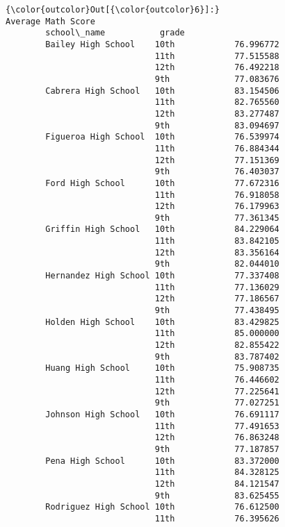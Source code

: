 \documentclass[11pt]{article}
\begin{document}
\begin{Verbatim}[commandchars=\\\{\}]
{\color{outcolor}Out[{\color{outcolor}6}]:}                              Average Math Score
        school\_name           grade                    
        Bailey High School    10th            76.996772
                              11th            77.515588
                              12th            76.492218
                              9th             77.083676
        Cabrera High School   10th            83.154506
                              11th            82.765560
                              12th            83.277487
                              9th             83.094697
        Figueroa High School  10th            76.539974
                              11th            76.884344
                              12th            77.151369
                              9th             76.403037
        Ford High School      10th            77.672316
                              11th            76.918058
                              12th            76.179963
                              9th             77.361345
        Griffin High School   10th            84.229064
                              11th            83.842105
                              12th            83.356164
                              9th             82.044010
        Hernandez High School 10th            77.337408
                              11th            77.136029
                              12th            77.186567
                              9th             77.438495
        Holden High School    10th            83.429825
                              11th            85.000000
                              12th            82.855422
                              9th             83.787402
        Huang High School     10th            75.908735
                              11th            76.446602
                              12th            77.225641
                              9th             77.027251
        Johnson High School   10th            76.691117
                              11th            77.491653
                              12th            76.863248
                              9th             77.187857
        Pena High School      10th            83.372000
                              11th            84.328125
                              12th            84.121547
                              9th             83.625455
        Rodriguez High School 10th            76.612500
                              11th            76.395626

\end{Verbatim}
\end{document}
